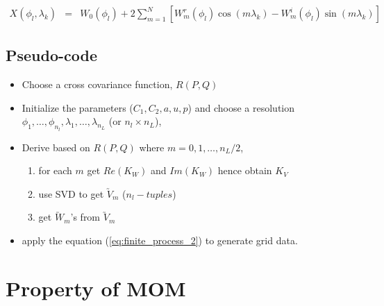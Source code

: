 	\begin{eqnarray} \label{eq:finite_process_2}
		X(\phi_l,\lambda_k) &=& W_0(\phi_l) + 2 \sum_{m =1}^N \left[W_m^r(\phi_l)\cos(m\lambda_k) - W_m^i(\phi_l)\sin(m \lambda_k)\right]
	\end{eqnarray}
	
	\subsection{Pseudo-code}
	
	\begin{itemize}
		\item Choose a cross covariance function, $R(P,Q)$
		\item Initialize the parameters ($C_1, C_2, a, u, p$) and choose a resolution $\phi_1,\ldots,\phi_{n_l}, \lambda_1, \ldots, \lambda_{n_L}$ (or $n_l\times n_L$),
		\item Derive \Cm based on $R(P,Q)$ where $m=0,1,\ldots,n_L/2$,
		      \begin{enumerate}
		      	\item for each $m$ get $Re(K_W)$ and $Im(K_W)$ hence obtain $K_V$
		      	\item use SVD to get $\utilde{V}_m$ ($n_l-tuples$)
		      	\item get $\utilde{W}_m$'s from $\utilde{V}_m$
		      \end{enumerate}
		      
		\item apply the equation (\ref{eq:finite_process_2}) to generate grid data.
	\end{itemize}
	
	
	\section{Property of MOM}
	
	
